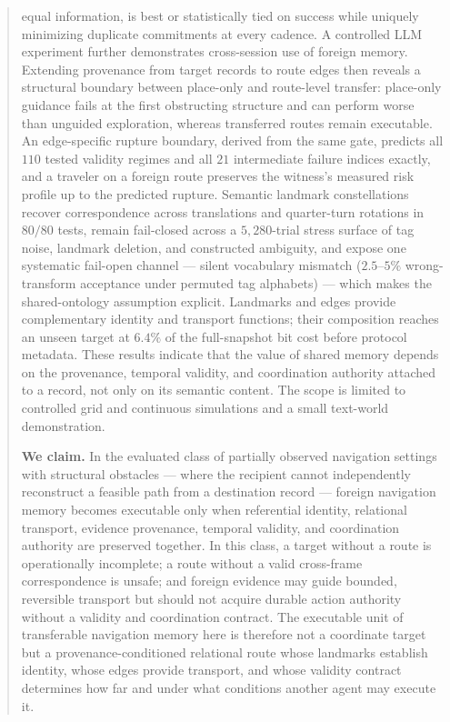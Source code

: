 \documentclass{article}
\begin{document}
\begin{abstract}
equal information, is best or statistically tied on success while
uniquely minimizing duplicate commitments at every cadence. A controlled LLM experiment further demonstrates
cross-session use of foreign memory. Extending provenance from target
records to route edges then reveals a structural boundary between
place-only and route-level transfer: place-only guidance fails at the
first obstructing structure and can perform worse than unguided
exploration, whereas transferred routes remain executable. An
edge-specific rupture boundary, derived from the same gate, predicts
all $110$ tested validity regimes and all $21$ intermediate failure
indices exactly, and a traveler on a foreign route preserves the
witness's measured risk profile up to the predicted rupture. Semantic landmark constellations recover
correspondence across translations and quarter-turn rotations in $80/80$
tests, remain fail-closed across a $5{,}280$-trial stress surface of
tag noise, landmark deletion, and constructed ambiguity, and expose
one systematic fail-open channel --- silent vocabulary mismatch
($2.5$--$5\%$ wrong-transform acceptance under permuted tag alphabets)
--- which makes the shared-ontology assumption explicit. Landmarks and edges provide
complementary identity and transport functions; their composition
reaches an unseen target at $6.4\%$ of the full-snapshot bit cost before
protocol metadata. These results indicate that the
value of shared memory depends on the provenance, temporal validity,
and coordination authority attached to a record, not only on its
semantic content. The scope is limited to controlled grid and
continuous simulations and a small text-world demonstration.
\par\medskip\noindent\textbf{We claim.} In the evaluated class of
partially observed navigation settings with structural obstacles ---
where the recipient cannot independently reconstruct a feasible path
from a destination record --- foreign navigation memory becomes
executable only when referential identity, relational transport,
evidence provenance, temporal validity, and coordination authority are
preserved together. In this class, a target without a route is
operationally incomplete; a route without a valid cross-frame
correspondence is unsafe; and foreign evidence may guide bounded,
reversible transport but should not acquire durable action authority
without a validity and coordination contract. The executable unit of
transferable navigation memory here is therefore not a coordinate
target but a provenance-conditioned relational route whose landmarks
establish identity, whose edges provide transport, and whose validity
contract determines how far and under what conditions another agent
may execute it.
\end{abstract}
\end{document}

